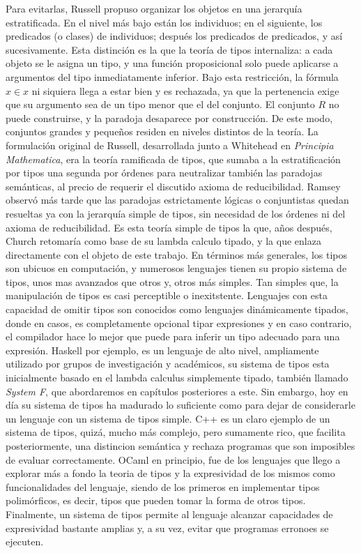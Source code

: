 \documentclass[a4paper,12pt]{report}
\theoremstyle{definition}
\theoremstyle{plain}
\theoremstyle{remark}
\begin{document}
\newline
\newline
\indent Para evitarlas, Russell propuso organizar los objetos en una jerarquía estratificada. En el nivel más bajo están los individuos; en el siguiente, los predicados (o clases) de individuos; después los predicados de predicados, y así sucesivamente. Esta distinción es la que la teoría de tipos internaliza: a cada objeto se le asigna un tipo, y una función proposicional solo puede aplicarse a argumentos del tipo inmediatamente inferior. Bajo esta restricción, la fórmula $x \in x$ ni siquiera llega a estar bien  y es rechazada, ya que la pertenencia exige que su argumento sea de un tipo menor que el del conjunto. El conjunto $R$ no puede construirse, y la paradoja desaparece por construcción. De este modo, conjuntos grandes y pequeños residen en niveles distintos de la teoría.
\newline
\newline
\indent La formulación original de Russell, desarrollada junto a Whitehead en \textit{Principia Mathematica}, era la teoría ramificada de tipos, que sumaba a la estratificación por tipos una segunda por órdenes para neutralizar también las paradojas semánticas, al precio de requerir el discutido axioma de reducibilidad. Ramsey observó más tarde que las paradojas estrictamente lógicas o conjuntistas quedan resueltas ya con la jerarquía simple de tipos, sin necesidad de los órdenes ni del axioma de reducibilidad. Es esta teoría simple de tipos la que, años después, Church retomaría como base de su lambda calculo tipado, y la que enlaza directamente con el objeto de este trabajo.
\newline
\newline
\indent En términos más generales, los tipos son ubicuos en computación, y numerosos lenguajes tienen su propio sistema de tipos, unos mas avanzados que otros y, otros más simples. Tan simples que, la manipulación de tipos es casi perceptible o inexitstente. Lenguajes con esta capacidad de omitir tipos son conocidos como lenguajes dinámicamente tipados, donde en casos, es completamente opcional tipar expresiones y en caso contrario, el compilador hace lo mejor que puede para inferir un tipo adecuado para una expresión. Haskell por ejemplo, es un lenguaje de alto nivel, ampliamente utilizado por grupos de investigación y académicos, su sistema de tipos esta inicialmente basado en el lambda calculus simplemente tipado, también llamado \textit{System F}, que abordaremos en capítulos posteriores a este. Sin embargo, hoy en día su sistema de tipos ha madurado lo suficiente como para dejar de considerarle un lenguaje con un sistema de tipos simple. C++ es un claro ejemplo de un sistema de tipos, quizá, mucho más complejo, pero sumamente rico, que facilita posteriormente, una distincion semántica y rechaza programas que son imposibles de evaluar correctamente. OCaml en principio, fue de los lenguajes que llego a explorar más a fondo la teoria de tipos y la expresividad de los mismos como funcionalidades del lenguaje, siendo de los primeros en implementar tipos polimórficos, es decir, tipos que pueden tomar la forma de otros tipos. Finalmente, un sistema de tipos permite al lenguaje alcanzar capacidades de expresividad bastante amplias y, a su vez, evitar que programas erronoes se ejecuten.
\end{document}
